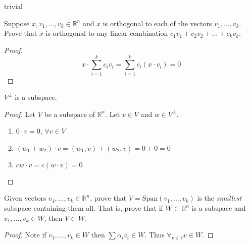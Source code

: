 \begin{exercise} \label{e1.3.2}
    trivial
\end{exercise} %

\begin{exercise} \label{e1.3.3}
    Suppose \(x,v_1,\ldots,v_k \in \mathbb{R}^n\) and \(x\) is orthogonal to each of the vectors \(v_1,\ldots,v_k\). Prove that \(x\) is orthogonal to any linear combination \(c_1v_1+c_2v_2+\ldots+c_kv_k\).
    
    \begin{proof}
        \[x \cdot \sum_{i=1}^{k} c_iv_i = \sum_{i=1}^k c_i (x \cdot v_i) = 0\]
    \end{proof}
\end{exercise} %

\begin{exercise} \label{e1.3.4}
    \(V^{\perp}\) is a subspace.
    
    \begin{proof}
        Let \(V\) be a subspace of \( \mathbb{R}^n \). Let \(v \in V \) and \( w \in V^{\perp} \).
        \begin{enumerate}
            \item \(0 \cdot v = 0\), \(\forall v \in V\)
            \item \((w_1+w_2)\cdot v = (w_1,v)+(w_2,v) = 0+0 = 0\)
            \item \(cw \cdot v = c(w \cdot v) = 0\)
        \end{enumerate}
    \end{proof}
\end{exercise} %

\begin{exercise} \label{e1.3.5}
    Given vectors \(v_1,\ldots,v_k \in \mathbb{R}^n\), prove that \(V=\text{Span}(v_1,\ldots,v_k)\) is the \emph{smallest} subspace containing them all. That is, prove that if \(W \subset \mathbb{R}^n\) is a subspace and \(v_1,\ldots,v_k \in W\), then \(V \subset W\).
    
    \begin{proof}
        Note if \(v_1,\ldots,v_k \in W\) then \(\sum \alpha_i v_i \in W\). Thus \(\displaystyle \forall_{v \in V} v \in W\).
    \end{proof}
\end{exercise} %

